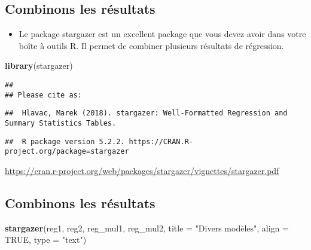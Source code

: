 \documentclass[
]{article}
\newenvironment{Shaded}{\begin{snugshade}}{\end{snugshade}}
\newcommand{\DataTypeTok}[1]{\textcolor[rgb]{0.13,0.29,0.53}{#1}}
\newcommand{\KeywordTok}[1]{\textcolor[rgb]{0.13,0.29,0.53}{\textbf{#1}}}
\newcommand{\NormalTok}[1]{#1}
\newcommand{\OtherTok}[1]{\textcolor[rgb]{0.56,0.35,0.01}{#1}}
\newcommand{\StringTok}[1]{\textcolor[rgb]{0.31,0.60,0.02}{#1}}
\providecommand{\tightlist}{%
  \setlength{\itemsep}{0pt}\setlength{\parskip}{0pt}}
\begin{document}
\hypertarget{combinons-les-ruxe9sultats}{%
\subsection{Combinons les résultats}\label{combinons-les-ruxe9sultats}}

\begin{itemize}
\tightlist
\item
  Le package stargazer est un excellent package que vous devez avoir
  dans votre boîte à outils R. Il permet de combiner plusieurs résultats
  de régression.
\end{itemize}

\begin{Shaded}
\begin{Highlighting}[]
\KeywordTok{library}\NormalTok{(stargazer)}
\end{Highlighting}
\end{Shaded}

\begin{verbatim}
## 
## Please cite as:
\end{verbatim}

\begin{verbatim}
##  Hlavac, Marek (2018). stargazer: Well-Formatted Regression and Summary Statistics Tables.
\end{verbatim}

\begin{verbatim}
##  R package version 5.2.2. https://CRAN.R-project.org/package=stargazer
\end{verbatim}

\url{https://cran.r-project.org/web/packages/stargazer/vignettes/stargazer.pdf}

\hypertarget{combinons-les-ruxe9sultats-1}{%
\subsection{Combinons les
résultats}\label{combinons-les-ruxe9sultats-1}}

\begin{Shaded}
\begin{Highlighting}[]
\KeywordTok{stargazer}\NormalTok{(reg1, reg2, reg_mul1, reg_mul2, }\DataTypeTok{title =} \StringTok{"Divers modèles"}\NormalTok{, }\DataTypeTok{align =} \OtherTok{TRUE}\NormalTok{, }\DataTypeTok{type =} \StringTok{"text"}\NormalTok{)}
\end{Highlighting}
\end{Shaded}
\end{document}
